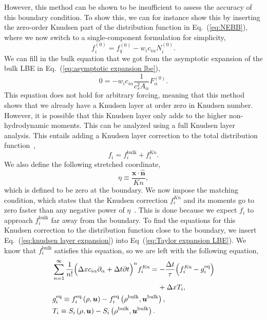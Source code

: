 \documentclass[aps,physrev,twocolumn,10pt]{revtex4-2}
\begin{document}
However, this method can be shown to be insufficient to assess the accuracy of this boundary condition. To show this, we can for instance show this by inserting the zero-order Knudsen part of the distribution function in Eq.~(\ref{eq:NEBB}), where we now switch to a single-component formulation for simplicity,
\begin{equation}
    f_i^{(0)} = f_q^{(0)} - w_i c_{i\alpha}N_i^{(0)}. 
\end{equation}
We can fill in the bulk equation that we got from the asymptotic expansion of the bulk LBE in Eq.~(\ref{eq:asymptotic expansion lbe}),  
\begin{equation}
    0 = -w_i c_{i\alpha} \frac{1}{c_s^2 A_\alpha} F_\alpha^{(0)}.
\end{equation}
This equation does not hold for arbitrary forcing, meaning that this method shows that we already have a Knudsen layer at order zero in Knudsen number. However, it is possible that this Knudsen layer only adds to the higher non-hydrodynamic moments. This can be analyzed using a full Knudsen layer analysis. This entails adding a Knudsen layer correction to the total distribution function~\cite{inamuro_accuracy_1997},
\begin{equation}\label{eq:knudsen layer expansion}
    f_i = f_i^\text{bulk} + f_i^\textit{Kn}.
\end{equation}
We also define the following stretched coordinate,
\begin{equation}
    \eta \equiv \frac{\bm{x}\cdot \hat{\bm{n}}}{\textit{Kn}},
\end{equation}
which is defined to be zero at the boundary. We now impose the matching condition, which states that the Knudsen correction $f_i^\textit{Kn}$ and its moments go to zero faster than any negative power of $\eta$~\cite{sone_kinetic_2002}. This is done because we expect $f_i$ to approach $f_i^\text{bulk}$ far away from the boundary. To find the equations for this Knudsen correction to the distribution function close to the boundary, we insert Eq.~(\ref{eq:knudsen layer expansion}) into Eq~(\ref{eq:Taylor expansion LBE}). We know that $f_i^\text{bulk}$ satisfies this equation, so we are left with the following equation,
\begin{equation}\label{eq:Taylor expansion knudsen}
\begin{split}
    &\sum_{n=1}^\infty \frac{1}{n!}\Bigl(\Delta x c_{i\alpha} \partial_\alpha + \Delta t \partial t\Bigr)^n f_i^\textit{Kn}=-\frac{\Delta t}{\tau}\Bigl(f_i^\textit{Kn}  - g^\text{eq}_i\Bigr)\\
    &\qquad\qquad\qquad\qquad\qquad\qquad\qquad\ \   + \Delta xT_i,\\
    &g^\text{eq}_i \equiv f^\text{eq}_i\left(\rho, \bm{u}\right) - f^\text{eq}_i\left(\rho^\text{bulk}, \bm{u}^\text{bulk}\right),\\
    &T_i \equiv S_i\left(\rho, \bm{u}\right) - S_i\left(\rho^\text{bulk}, \bm{u}^\text{bulk}\right).
\end{split}
\end{equation}
\end{document}
